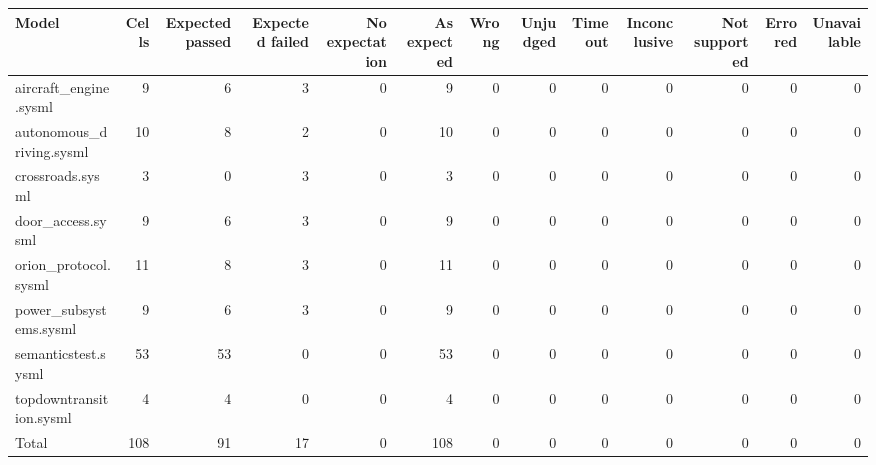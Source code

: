 \begin{tabular}{lrrrrrrrrrrrr}
\toprule
Model & Cells & Expected passed & Expected failed & No expectation & As expected & Wrong & Unjudged & Timeout & Inconclusive & Not supported & Errored & Unavailable \\
\midrule
aircraft\_engine.sysml & 9 & 6 & 3 & 0 & 9 & 0 & 0 & 0 & 0 & 0 & 0 & 0 \\
autonomous\_driving.sysml & 10 & 8 & 2 & 0 & 10 & 0 & 0 & 0 & 0 & 0 & 0 & 0 \\
crossroads.sysml & 3 & 0 & 3 & 0 & 3 & 0 & 0 & 0 & 0 & 0 & 0 & 0 \\
door\_access.sysml & 9 & 6 & 3 & 0 & 9 & 0 & 0 & 0 & 0 & 0 & 0 & 0 \\
orion\_protocol.sysml & 11 & 8 & 3 & 0 & 11 & 0 & 0 & 0 & 0 & 0 & 0 & 0 \\
power\_subsystems.sysml & 9 & 6 & 3 & 0 & 9 & 0 & 0 & 0 & 0 & 0 & 0 & 0 \\
semanticstest.sysml & 53 & 53 & 0 & 0 & 53 & 0 & 0 & 0 & 0 & 0 & 0 & 0 \\
topdowntransition.sysml & 4 & 4 & 0 & 0 & 4 & 0 & 0 & 0 & 0 & 0 & 0 & 0 \\
\midrule
Total & 108 & 91 & 17 & 0 & 108 & 0 & 0 & 0 & 0 & 0 & 0 & 0 \\
\bottomrule
\end{tabular}
